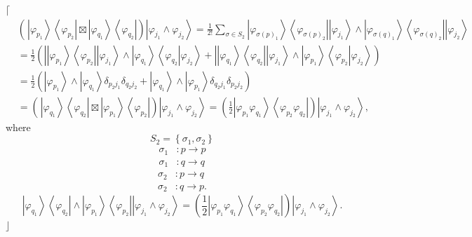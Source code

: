 \documentclass[aps,preprint]{revtex4}%
\begin{document}
$\lceil$%
\begin{align}
&  \left(  \frac{{}}{{}}\left\vert \varphi_{p_{1}}\right\rangle \left\langle
\varphi_{p_{2}}\right\vert \boxtimes\left\vert \varphi_{q_{1}}\right\rangle
\left\langle \varphi_{q_{2}}\right\vert \right)  \left\vert \varphi_{j_{1}%
}\wedge\varphi_{j_{2}}\right\rangle =\frac{1}{2!}\sum_{\sigma\in S_{2}%
}\left\vert \varphi_{\sigma\left(  p\right)  _{1}}\right\rangle \left\langle
\varphi_{\sigma\left(  p\right)  _{2}}\right\vert \left\vert \varphi_{j_{1}%
}\right\rangle \wedge\left\vert \varphi_{\sigma\left(  q\right)  _{1}%
}\right\rangle \left\langle \varphi_{\sigma\left(  q\right)  _{2}}\right\vert
\left\vert \varphi_{j_{2}}\right\rangle \\
&  =\frac{1}{2}\left(  \left\vert \left\vert \varphi_{p_{1}}\right\rangle
\left\langle \varphi_{p_{2}}\right\vert \left\vert \varphi_{j_{1}%
}\right\rangle \wedge\left\vert \varphi_{q_{1}}\right\rangle \left\langle
\varphi_{q_{2}}\right\vert \varphi_{j_{2}}\right\rangle +\left\vert \left\vert
\varphi_{q_{1}}\right\rangle \left\langle \varphi_{q_{2}}\right\vert
\left\vert \varphi_{j_{1}}\right\rangle \wedge\left\vert \varphi_{p_{1}%
}\right\rangle \left\langle \varphi_{p_{2}}\right\vert \varphi_{j_{2}%
}\right\rangle \right)  \\
&  =\frac{1}{2}\left(  \left\vert \varphi_{p_{1}}\right\rangle \wedge
\left\vert \varphi_{q_{1}}\right\rangle \delta_{p_{2}j_{1}}\delta_{q_{2}j_{2}%
}+\left\vert \varphi_{q_{1}}\right\rangle \wedge\left\vert \varphi_{p_{1}%
}\right\rangle \delta_{q_{2}j_{1}}\delta_{p_{2}j_{2}}\right)  \\
&  =\left(  \frac{{}}{{}}\left\vert \varphi_{q_{1}}\right\rangle \left\langle
\varphi_{q_{2}}\right\vert \boxtimes\left\vert \varphi_{p_{1}}\right\rangle
\left\langle \varphi_{p_{2}}\right\vert \right)  \left\vert \varphi_{j_{1}%
}\wedge\varphi_{j_{2}}\right\rangle =\left(  \frac{1}{2}\left\vert
\varphi_{p_{1}}\varphi_{q_{1}}\right\rangle \left\langle \varphi_{p_{2}%
}\varphi_{q_{2}}\right\vert \right)  \left\vert \varphi_{j_{1}}\wedge
\varphi_{j_{2}}\right\rangle ,
\end{align}
where%
\begin{equation}
S_{2}=\left\{  \sigma_{1},\sigma_{2}\right\}
\end{equation}%
\begin{align}
\sigma_{1} &  :p\rightarrow p\\
\sigma_{1} &  :q\rightarrow q
\end{align}%
\begin{align}
\sigma_{2} &  :p\rightarrow q\\
\sigma_{2} &  :q\rightarrow p.
\end{align}%
\begin{equation}
\left\vert \varphi_{q_{1}}\right\rangle \left\langle \varphi_{q_{2}%
}\right\vert \wedge\left\vert \varphi_{p_{1}}\right\rangle \left\langle
\varphi_{p_{2}}\right\vert \left\vert \varphi_{j_{1}}\wedge\varphi_{j_{2}%
}\right\rangle =\left(  \frac{1}{2}\left\vert \varphi_{p_{1}}\varphi_{q_{1}%
}\right\rangle \left\langle \varphi_{p_{2}}\varphi_{q_{2}}\right\vert \right)
\left\vert \varphi_{j_{1}}\wedge\varphi_{j_{2}}\right\rangle .
\end{equation}
$\rfloor$
\end{document}
